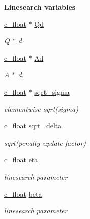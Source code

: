 \begin{Indent}\textbf{ Linesearch variables}\par
\begin{DoxyCompactItemize}
\item 
\mbox{\hyperlink{global__opts_8h_a7f1a9fda95e52979658c20a0d134fb15}{c\+\_\+float}} $\ast$ \mbox{\hyperlink{structQPALMWorkspace_af3614a39bf75c0331f89447caa3d1217}{Qd}}
\begin{DoxyCompactList}\small\item\em Q $\ast$ d. \end{DoxyCompactList}\item 
\mbox{\hyperlink{global__opts_8h_a7f1a9fda95e52979658c20a0d134fb15}{c\+\_\+float}} $\ast$ \mbox{\hyperlink{structQPALMWorkspace_ae40218985461185bbab01576ed8a1ca5}{Ad}}
\begin{DoxyCompactList}\small\item\em A $\ast$ d. \end{DoxyCompactList}\item 
\mbox{\hyperlink{global__opts_8h_a7f1a9fda95e52979658c20a0d134fb15}{c\+\_\+float}} $\ast$ \mbox{\hyperlink{structQPALMWorkspace_a5628bcd9c8b6ab0ca4dd5015a0c39fb8}{sqrt\+\_\+sigma}}
\begin{DoxyCompactList}\small\item\em elementwise sqrt(sigma) \end{DoxyCompactList}\item 
\mbox{\hyperlink{global__opts_8h_a7f1a9fda95e52979658c20a0d134fb15}{c\+\_\+float}} \mbox{\hyperlink{structQPALMWorkspace_adc663b895fd02bd845677d6e928f029e}{sqrt\+\_\+delta}}
\begin{DoxyCompactList}\small\item\em sqrt(penalty update factor) \end{DoxyCompactList}\item 
\mbox{\hyperlink{global__opts_8h_a7f1a9fda95e52979658c20a0d134fb15}{c\+\_\+float}} \mbox{\hyperlink{structQPALMWorkspace_a04c63ad7652fa2b21cd7bfcbfed38b18}{eta}}
\begin{DoxyCompactList}\small\item\em linesearch parameter \end{DoxyCompactList}\item 
\mbox{\hyperlink{global__opts_8h_a7f1a9fda95e52979658c20a0d134fb15}{c\+\_\+float}} \mbox{\hyperlink{structQPALMWorkspace_a68ed6544f86dc7a29a5f7c2fe26ffccc}{beta}}
\begin{DoxyCompactList}\small\item\em linesearch parameter \end{DoxyCompactList}\item 

\end{DoxyCompactItemize}
\end{Indent}
